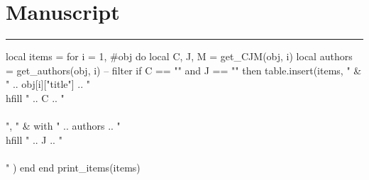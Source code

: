 \documentclass{article}
\begin{document}

\section*{Manuscript}
\vspace{-1em} \hrule \vspace{1em}

\begin{luacode}
  local items = {}
  for i = 1, #obj do
    local C, J, M = get_CJM(obj, i)
    local authors = get_authors(obj, i)
    -- filter
    if C == "" and J == "" then
      table.insert(items, {
        " & " .. obj[i]["title"] .. " \\hfill " .. C .. "\\\\",
        " & with " .. authors .. " \\hfill " .. J .. "\\\\"
      })
    end
  end
  print_items(items)
\end{luacode}
\end{document}
